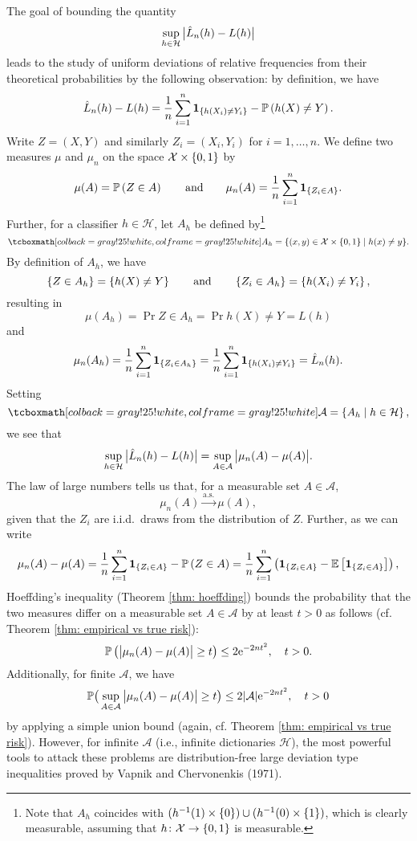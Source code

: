 The goal of bounding the quantity
\[
    \sup_{h \in \mathcal{H}} \big\lvert \hat L_n(h) - L(h) \big\rvert
\]
leads to the study of uniform deviations of relative frequencies from their theoretical probabilities by the following observation: by definition, we have
\[
    \hat L_n(h) - L(h) = \frac{1}{n} \sum_{i=1}^n \mathbf{1}_{\left\{h(X_i) \neq Y_i\right\}} - \mathbb{P}\left(h(X) \neq Y\right).
\]
Write $Z = (X, Y)$ and similarly $Z_i = (X_i, Y_i)$ for $i = 1, \dots, n$. We define two measures $\mu$ and $\mu_n$ on the space $\mathcal{X} \times \left\{0, 1\right\}$ by
\[
    \mu(A) = \mathbb{P}\left(Z \in A\right) \qquad \text{and} \qquad \mu_n(A) = \frac{1}{n} \sum_{i=1}^n \mathbf{1}_{\left\{Z_i \in A\right\}}.
\]
Further, for a classifier $h \in \mathcal{H}$, let $A_h$ be defined by\footnote{Note that $A_h$ coincides with $(h^{-1}(1) \times \left\{0\right\}) \cup (h^{-1}(0) \times \left\{1\right\})$, which is clearly measurable, assuming that $h \colon \mathcal{X} \to \left\{0, 1\right\}$ is measurable.}
\begin{equation}
\label{eq: sets A_h}
    \highlightMath{
        A_h = \{ (x, y) \in \mathcal{X} \times \set{0, 1} \with h(x) \neq y \}.
    }
\end{equation}
By definition of $A_h$, we have
\[
    \left\{Z \in A_h\right\} = \left\{h(X) \neq Y\right\} \qquad \text{and} \qquad \left\{Z_i \in A_h\right\} = \left\{h(X_i) \neq Y_i\right\},
\]
resulting in
\[
    \mu(A_h) = \Pr{Z \in A_h} = \Pr{h(X) \neq Y} = L(h)
\]
and
\[
    \mu_n(A_h) = \frac{1}{n} \sum_{i=1}^n \mathbf{1}_{\left\{Z_i \in A_h\right\}} = \frac{1}{n} \sum_{i=1}^n \mathbf{1}_{\left\{h(X_i) \neq Y_i\right\}} = \hat L_n(h).
\]
Setting
\begin{equation}
\label{eq: collection of sets A_h}
    \highlightMath{
        \mathcal{A} = \set{A_h \with h \in \mathcal{H}},
    }
\end{equation}
we see that
\[
    \sup_{h \in \mathcal{H}} \big\lvert \hat L_n(h) - L(h) \big\rvert = \sup_{A \in \mathcal{A}} \big\lvert \mu_n(A) - \mu(A) \big\rvert.
\]
The law of large numbers tells us that, for a measurable set $A \in \mathcal{A}$,
\[
    \mu_n(A) \xrightarrow{\mathrm{a.s.}} \mu(A),
\]
given that the $Z_i$ are i.i.d.\ draws from the distribution of $Z$. Further, as we can write
\[
    \mu_n(A) - \mu(A) = \frac{1}{n} \sum_{i=1}^n \mathbf{1}_{\left\{Z_i \in A\right\}} - \mathbb{P}\left(Z \in A\right) = \frac{1}{n} \sum_{i=1}^n \left( \mathbf{1}_{\left\{Z_i \in A\right\}} - \mathbb{E}\left[\mathbf{1}_{\left\{Z_i \in A\right\}}\right] \right),
\]
Hoeffding's inequality (Theorem \ref{thm: hoeffding}) bounds the probability that the two measures differ on a measurable set $A \in \mathcal{A}$ by at least $t > 0$ as follows (cf. Theorem \ref{thm: empirical vs true risk}):
\[
    \mathbb{P}\left(\big\lvert \mu_n(A) - \mu(A) \big\rvert \geq t\right) \leq 2\mathrm{e}^{-2nt^2}, \quad t > 0.
\]
Additionally, for finite $\mathcal{A}$, we have
\[
    \mathbb{P}\big( \sup_{A \in \mathcal{A}} \big\lvert \mu_n(A) - \mu(A) \big\rvert \geq t \big) \leq 2 \abs{\mathcal{A}} \mathrm{e}^{-2nt^2}, \quad t > 0
\]
by applying a simple union bound (again, cf. Theorem \ref{thm: empirical vs true risk}). However, for infinite $\mathcal{A}$ (i.e., infinite dictionaries $\mathcal{H}$), the most powerful tools to attack these problems are distribution-free large deviation type inequalities proved by Vapnik and Chervonenkis (1971).

